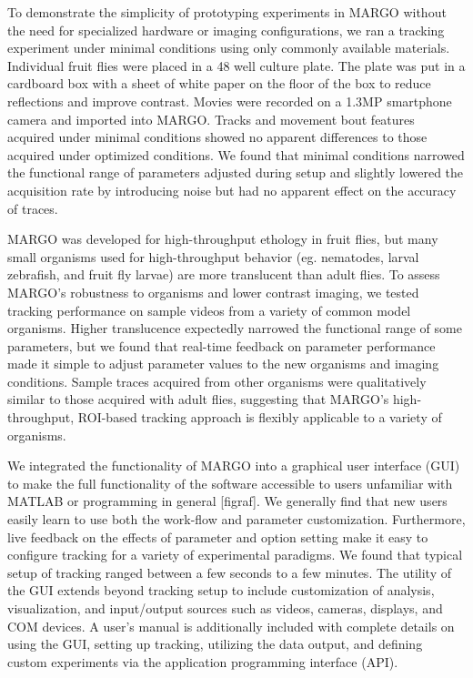 \documentclass[10pt]{article}
\begin{document}
\begin{multicols}{2}
To demonstrate the simplicity of prototyping experiments in MARGO without the need for specialized hardware or imaging configurations, we ran a tracking experiment under minimal conditions using only commonly available materials.  Individual fruit flies were placed in a 48 well culture plate. The plate was put in a cardboard box with a sheet of white paper on the floor of the box to reduce reflections and improve contrast. Movies were recorded on a 1.3MP smartphone camera and imported into MARGO. Tracks and movement bout features acquired under minimal conditions showed no apparent differences to those acquired under optimized conditions. We found that minimal conditions narrowed the functional range of parameters adjusted during setup and slightly lowered the acquisition rate by introducing noise but had no apparent effect on the accuracy of traces.

MARGO was developed for high-throughput ethology in fruit flies, but many small organisms used for high-throughput behavior (eg. nematodes, larval zebrafish, and fruit fly larvae) are more translucent than adult flies. To assess MARGO’s robustness to organisms and lower contrast imaging, we tested tracking performance on sample videos from a variety of common model organisms. Higher translucence expectedly narrowed the functional range of some parameters, but we found that real-time feedback on parameter performance made it simple to adjust parameter values to the new organisms and imaging conditions. Sample traces acquired from other organisms were qualitatively similar to those acquired with adult flies, suggesting that MARGO’s high-throughput, ROI-based tracking approach is flexibly applicable to a variety of organisms. 

We integrated the functionality of MARGO into a graphical user interface (GUI) to make the full functionality of the software accessible to users unfamiliar with MATLAB or programming in general [figraf]. We generally find that new users easily learn to use both the work-flow and parameter customization. Furthermore, live feedback on the effects of parameter and option setting make it easy to configure tracking for a variety of experimental paradigms. We found that typical setup of tracking ranged between a few seconds to a few minutes. The utility of the GUI extends beyond tracking setup to include customization of analysis, visualization, and input/output sources such as videos, cameras, displays, and COM devices. A user's manual is additionally included with complete details on using the GUI, setting up tracking, utilizing the data output, and defining custom experiments via the application programming interface (API).



\end{multicols}
\end{document}
